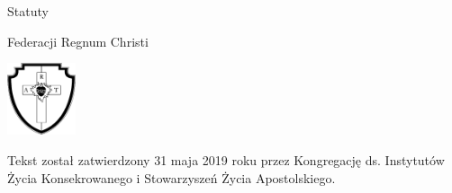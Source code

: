 ﻿\begin{center}

\thispagestyle{empty}

\vspace*{3cm}

{\Huge Statuty}

{\Huge Federacji Regnum Christi}

\vspace*{2cm}

\includegraphics[width=2cm]{rc-logo-bw-712-755}

\end{center}

\clearpage




\vspace*{6cm}


Tekst został zatwierdzony 31 maja 2019 roku przez Kongregację ds. Instytutów Życia Konsekrowanego i Stowarzyszeń Życia Apostolskiego.


\newpage




